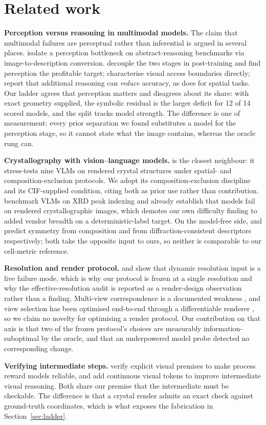 \section{Related work}
\textbf{Perception versus reasoning in multimodal models.} The claim that multimodal failures are
perceptual rather than inferential is argued in several places. \citet{arc2512} isolate a perception
bottleneck on abstract-reasoning benchmarks via image-to-description conversion. \citet{decouple2605}
decouple the two stages in post-training and find perception the profitable target; \citet{vab2607}
characterise visual access boundaries directly; \citet{dual2509} report that additional reasoning can
\emph{reduce} accuracy, as does \citet{cotdeg2604} for spatial tasks. Our ladder agrees that perception
matters and disagrees about its share: with exact geometry supplied, the symbolic residual is the larger
deficit for 12 of 14 scored models, and the split tracks model strength. The difference is one of
measurement: every prior separation we found substitutes a model for the perception stage, so it cannot
state what the image contains, whereas the oracle rung can.

\textbf{Crystallography with vision--language models.} \citet{xcrys2506} is the closest neighbour: it
stress-tests nine VLMs on rendered crystal structures under spatial- and composition-exclusion protocols.
We adopt its composition-exclusion discipline and its CIF-supplied condition, citing both as prior use
rather than contribution. \citet{xrdbench2605} benchmark VLMs on XRD peak indexing and already establish
that models fail on rendered crystallographic images, which demotes our own difficulty finding to added
vendor breadth on a deterministic-label target. On the model-free side, \citet{cryspnet2003} and
\citet{extinction2411} predict symmetry from composition and from diffraction-consistent descriptors
respectively; both take the opposite input to ours, so neither is comparable to our cell-metric reference.

\textbf{Resolution and render protocol.} \citet{resbench2510} and \citet{nativevis2506} show that dynamic
resolution input is a live failure mode, which is why our protocol is frozen at a single resolution and why
the effective-resolution audit is reported as a render-design observation rather than a finding.
Multi-view correspondence is a documented weakness \citep{allangles2504}, and view selection has been
optimised end-to-end through a differentiable renderer \citep{mvtn2011}, so we claim no novelty for
optimising a render protocol. Our contribution on that axis is that two of the frozen protocol's choices
are measurably information-suboptimal by the oracle, and that an underpowered model probe detected no
corresponding change.

\textbf{Verifying intermediate steps.} \citet{groundscore2603} verify explicit visual premises to make
process reward models reliable, and \citet{cvt2511} add continuous visual tokens to improve intermediate
visual reasoning. Both share our premise that the intermediate must be checkable. The difference is that a
crystal render admits an exact check against ground-truth coordinates, which is what exposes the
fabrication in Section~\ref{sec:ladder}.
